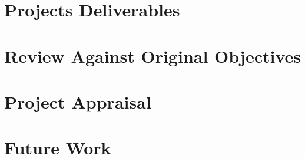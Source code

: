 \section{Projects Deliverables}
\section{Review Against Original Objectives}
\section{Project Appraisal}
\section{Future Work}